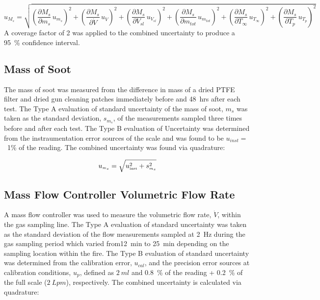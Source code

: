 \documentclass[12pt]{article}
\begin{document}
\begin{equation}
\label{eq:soot_mass_frac_uncertainty}
u_{\scriptscriptstyle M_{s}} = \sqrt{{\left(\frac{\partial M_{s}}{\partial m_{s}}\,u_{\scriptscriptstyle m_{s}} \right)}^2+{\left(\frac{\partial M_{s}}{\partial \dot{V} }\,u_{\scriptscriptstyle \dot{V}} \right)}^2+{\left(\frac{\partial M_{s}}{\partial V_{sl}}\,u_{\scriptscriptstyle V_{sl}} \right)}^2+{\left(\frac{\partial M_{s}}{\partial m_{tot}}\,u_{\scriptscriptstyle m_{tot}} \right)}^2+{\left(\frac{\partial M_{s}}{\partial T_{\infty}}\,u_{\scriptscriptstyle T_{\infty}} \right)}^2+{\left(\frac{\partial M_{s}}{\partial T_{p}}\,u_{\scriptscriptstyle T_{p}} \right)}^2}
\end{equation}
A coverage factor of 2 was applied to the combined uncertainty to produce a 95~\% confidence interval.

\subsection{Mass of Soot}
\label{ssec:Mass_of_Soot}

The mass of soot was measured from the difference in mass of a dried PTFE filter and dried gun cleaning patches immediately before and 48~\si{hrs} after each test. The Type A evaluation of standard uncertainty of the mass of soot, $m_{s}$ was taken as the standard deviation, $s_{m_{s}}$, of the measurements sampled three times before and after each test. The Type B evaluation of Uncertainty was determined from the instraumentation error sources of the scale and was found to be $u_{inst}=$~1\% of the reading. The combined uncertainty was found via quadrature:

\begin{equation}
\label{eq:soot_mass_uncertainty}
u_{\scriptscriptstyle m_{s}} = \sqrt{u_{\rm \scriptscriptstyle inst}^2 + s_{\scriptscriptstyle m_{s}}^2}
\end{equation}

\subsection{Mass Flow Controller Volumetric Flow Rate}
\label{ssec:Mass_Flow_Controller_Volumetric_Flow_Rate}

A mass flow controller was used to measure the volumetric flow rate, $\dot{V}$, within the gas sampling line. The Type A evaluation of standard uncertainty was taken as the standard deviation of the flow measurements sampled at 2~\si{Hz} during the gas sampling period which varied from12~\si{min} to 25~\si{min} depending on the sampling location within the fire. The Type B evaluation of standard uncertainty was determined from the calibration error, $u_{cal}$, and the precision error sources at calibration conditions, $u_{p}$, defined as $2~\si{ml}$ and 0.8~\% of the reading + 0.2~\% of the full scale ($2~\si{Lpm}$), respectively. The combined uncertainty is calculated via quadrature:
\end{document}
